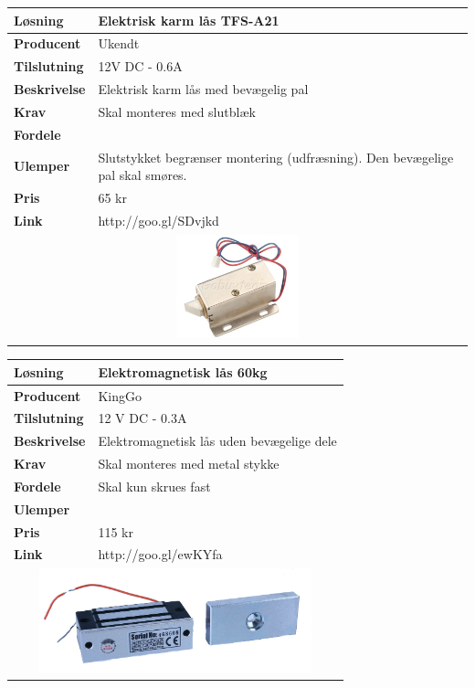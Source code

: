 \begin{table}[!h] \centering	
	\label{tab:laas1}
\begin{tabular}{|p{6cm}|p{8cm}|}
	\hline
		\textbf{Løsning}				&Elektrisk karm lås TFS-A21 \\ \hline
		\textbf{Producent} 			&Ukendt \\ \hline
		\textbf{Tilslutning} 		&12V DC - 0.6A \\ \hline
		\textbf{Beskrivelse} 		&Elektrisk karm lås med bevægelig pal \\ \hline
		\textbf{Krav} 				&Skal monteres med slutblæk \\ \hline
		\textbf{Fordele}				& \\ \hline
		\textbf{Ulemper} 			&Slutstykket begrænser montering (udfræsning). Den bevægelige pal skal smøres. \\ \hline
		\textbf{Pris} 				&65 kr \\ \hline
		\textbf{Link} 				&http://goo.gl/SDvjkd \\ \hline	
		\multicolumn{2}{|c|}{
			\includegraphics[height=3cm]{billeder/TFS-A21}} \\ \hline	
\end{tabular}
\end{table}

\begin{table}[!h] \centering
	\label{tab:laas2}
\begin{tabular}{|p{6cm}|p{8cm}|}
	\hline
		\textbf{Løsning}				&Elektromagnetisk lås 60kg \\ \hline
		\textbf{Producent} 			&KingGo \\ \hline
		\textbf{Tilslutning} 		&12 V DC - 0.3A\\ \hline
		\textbf{Beskrivelse} 		&Elektromagnetisk lås uden bevægelige dele \\ \hline
		\textbf{Krav} 				&Skal monteres med metal stykke \\ \hline
		\textbf{Fordele}				&Skal kun skrues fast \\ \hline
		\textbf{Ulemper} 			& \\ \hline
		\textbf{Pris} 				&115 kr \\ \hline
		\textbf{Link} 				&http://goo.gl/ewKYfa\\ \hline	
		\multicolumn{2}{|c|}{ 
			\includegraphics[height=3cm]{billeder/magnetic}} \\ \hline	
\end{tabular}
\end{table}